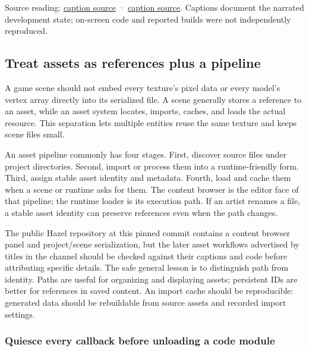 Source reading: \href{https://www.youtube.com/watch?v=kIbW4Kv6p4c}{caption source} · \href{https://www.youtube.com/watch?v=Uk2p3vKBMXE}{caption source}. Captions document the narrated development state; on-screen code and reported builds were not independently reproduced.

\subsection{Treat assets as references plus a pipeline}\label{06-engine-ii-ch027-treat-assets-as-references-plus-a-pipeline}

\hypertarget{06-engine-ii-ch027-treat-assets-as-references-plus-a-pipeline}{}

A game scene should not embed every texture's pixel data or every model's vertex array directly into its serialized file. A scene generally stores a reference to an asset, while an asset system locates, imports, caches, and loads the actual resource. This separation lets multiple entities reuse the same texture and keeps scene files small.

An asset pipeline commonly has four stages. First, discover source files under project directories. Second, import or process them into a runtime-friendly form. Third, assign stable asset identity and metadata. Fourth, load and cache them when a scene or runtime asks for them. The content browser is the editor face of that pipeline; the runtime loader is its execution path. If an artist renames a file, a stable asset identity can preserve references even when the path changes.

The public Hazel repository at this pinned commit contains a content browser panel and project/scene serialization, but the later asset workflows advertised by titles in the channel should be checked against their captions and code before attributing specific details. The safe general lesson is to distinguish path from identity. Paths are useful for organizing and displaying assets; persistent IDs are better for references in saved content. An import cache should be reproducible: generated data should be rebuildable from source assets and recorded import settings.

\subsubsection{Quiesce every callback before unloading a code module}\label{06-engine-ii-ch027-quiesce-every-callback-before-unloading-a-code-module}

